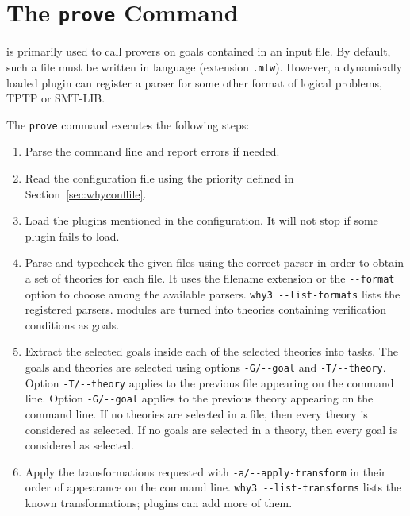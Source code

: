 \section{The \texttt{prove} Command}
\label{sec:why3ref}

\why is primarily used to call provers on goals contained in an
input file. By default, such a file must be written in \whyml language
(extension \texttt{.mlw}).
However, a dynamically loaded
plugin can register a parser for some other format of logical problems,
\eg TPTP or SMT-LIB.

The \texttt{prove} command executes the following steps:
\begin{enumerate}
\item Parse the command line and report errors if needed.
\item Read the configuration file using the priority defined in
  Section~\ref{sec:whyconffile}.
\item Load the plugins mentioned in the configuration. It will not
  stop if some plugin fails to load.
\item Parse and typecheck the given files using the correct parser in order
  to obtain a set of \why theories for each file. It uses
  the filename extension or the \verb|--format| option to choose
  among the available parsers. \verb|why3 --list-formats| lists
  the registered parsers.
  \whyml modules are turned into
  theories containing verification conditions as goals.
\item Extract the selected goals inside each of the selected theories
  into tasks. The goals and theories are selected using options
  \verb|-G/--goal| and \verb|-T/--theory|. Option
  \verb|-T/--theory| applies to the previous file appearing on the
  command line. Option \verb|-G/--goal| applies to the previous theory
  appearing on the command line. If no theories are selected in a file,
  then every theory is considered as selected. If no goals are selected
  in a theory, then every goal is considered as selected.
\item Apply the transformations requested
  with \verb|-a/--apply-transform| in their order of appearance on the
  command line. \verb|why3 --list-transforms| lists the known
  transformations; plugins can add more of them.

\end{enumerate}
